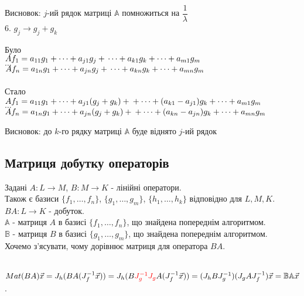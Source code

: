 \documentclass[a4paper, 10pt]{article}
\theoremstyle{theoremdd}
\begin{document}
	Висновок: $j$-ий рядок матриці $\mathbb{A}$ помножиться на $\dfrac{1}{\lambda}$
	\bigskip \\
	6. $g_j \rightarrow g_j + g_k$
	\multicolsep=0pt
	\begin{multicols}{2}
	Було \\
	$Af_1 = a_{11}g_1 + \dots + a_{j1}g_j + \\ \dots + a_{k1}g_k + \dots + a_{m1}g_m$\\
	$\dots$\\
	$Af_n = a_{1n}g_1 + \dots + a_{jn}g_j + \\ \dots + a_{kn}g_k + \dots + a_{mn}g_m$\\
	\columnbreak
	\\
	Стало \\
	$Af_1 = a_{11}g_1 + \dots + a_{j1}(g_j+g_k) + \\ + \dots + (a_{k1}-a_{j1})g_k + \dots + a_{m1}g_m$\\
	$\dots$\\
	$Af_n = a_{1n}g_1 + \dots + a_{jn}(g_j+g_k) + \\ + \dots + (a_{kn}-a_{jn})g_k + \dots + a_{mn}g_m$
	\end{multicols}
	Висновок: до $k$-го рядку матриці $\mathbb{A}$ буде віднято $j$-ий рядок
	\fi
	
	\subsection{Матриця добутку операторів}
	Задані $A: L \to M$, $B: M \to K$ - лінійні оператори.\\
	Також є базиси $\{f_1,\dots, f_n\}$, $\{g_1,\dots, g_m\}$, $\{h_1,\dots, h_k\}$ відповідно для $L,M,K$.\\
	$BA: L \to K$ - добуток.\\
	$\mathbb{A}$ - матриця $A$ в базисі $\{f_1,\dots,f_n\}$, що знайдена попереднім алгоритмом.\\
	$\mathbb{B}$ - матриця $B$ в базисі $\{g_1,\dots,g_m\}$, що знайдена попереднім алгоритмом.\\
	Хочемо з'ясувати, чому дорівнює матриця для оператора $BA$.\\
	\\
	$Mat(BA)\vec{x} = J_h(BA(J_f^{-1} \vec{x})) = J_h(B \textcolor{red}{J_g^{-1} J_g} A(J_f^{-1} \vec{x})) = (J_h B J_g^{-1})(J_g A J_f^{-1}) \vec{x} = \mathbb{B} \mathbb{A} \vec{x}$.
\end{document}
